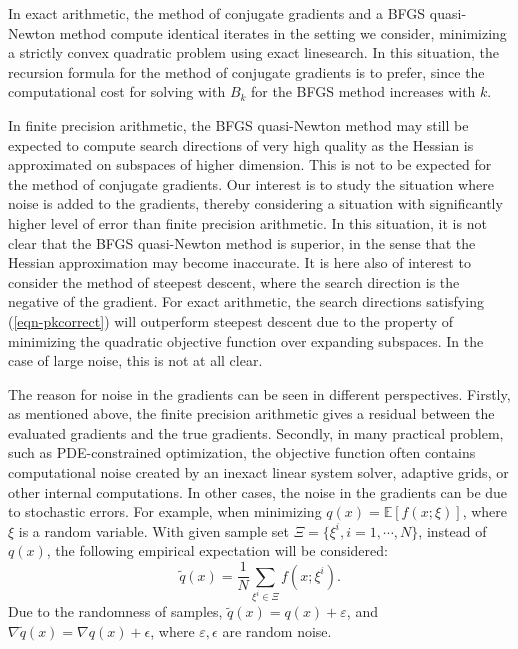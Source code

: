 \documentclass[11pt,twoside]{article}
\begin{document}
In exact arithmetic, the method of conjugate gradients and a BFGS
quasi-Newton method compute identical iterates in the setting we
consider, minimizing a strictly convex quadratic problem using exact
linesearch. In this situation, the recursion formula for the method of
conjugate gradients is to prefer, since the computational cost for
solving with $B_k$ for the BFGS method increases with $k$.

In finite precision arithmetic, the BFGS quasi-Newton method may still
be expected to compute search directions of very high quality as the
Hessian is approximated on subspaces of higher dimension. This is not
to be expected for the method of conjugate gradients. Our interest is
to study the situation where noise is added to the gradients, thereby
considering a situation with significantly higher level of error than
finite precision arithmetic. In this situation, it is not clear that
the BFGS quasi-Newton method is superior, in the sense that the
Hessian approximation may become inaccurate. It is here also of
interest to consider the method of steepest descent, where the search
direction is the negative of the gradient. For exact arithmetic, the
search directions satisfying (\ref{eqn-pkcorrect}) will outperform
steepest descent due to the property of minimizing the quadratic
objective function over expanding subspaces. In the case of large
noise, this is not at all clear.

The reason for noise in the gradients can be seen in different
perspectives.  Firstly, as mentioned above, the finite precision
arithmetic gives a residual between the evaluated gradients and the
true gradients.  Secondly, in many practical problem, such as
PDE-constrained optimization, the objective function often contains
computational noise created by an inexact linear system solver,
adaptive grids, or other internal computations.  In other cases, the
noise in the gradients can be due to stochastic errors. For example,
when minimizing $q(x) = \mathbb{E}[f(x;\xi)]$, where $\xi$ is a random
variable. With given sample set $\Xi=\{\xi^i, i=1,\cdots,N \}$,
instead of $q(x)$, the following empirical expectation will be
considered:
\[
      \tilde q(x) = \frac{1}{N}\sum_{\xi^i \in \Xi}f(x;\xi^i).
\]
Due to the randomness of samples, $\tilde q(x) = q(x) + \varepsilon$, and $\nabla \tilde q(x) = \nabla q(x) + \epsilon$, where $\varepsilon, \epsilon$ are random noise.
\end{document}
